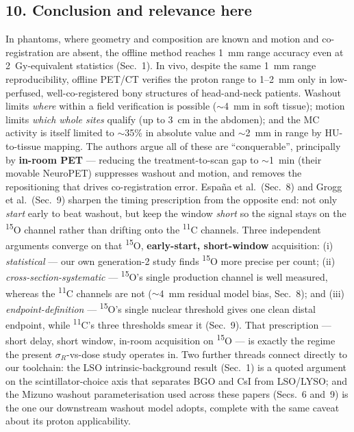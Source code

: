 \documentclass[11pt]{article}
\newcommand{\iso}[2]{\textsuperscript{#1}#2}
\begin{document}
\subsection*{10. Conclusion and relevance here}

In phantoms, where geometry and composition are known and motion and
co-registration are absent, the offline method reaches 1~mm range accuracy even
at 2~Gy-equivalent statistics (Sec.~1). In vivo, despite the same 1~mm range
reproducibility, offline PET/CT verifies the proton range to 1--2~mm only in
low-perfused, well-co-registered bony structures of head-and-neck patients.
Washout limits \emph{where} within a field verification is possible ($\sim$4~mm
in soft tissue); motion limits \emph{which whole sites} qualify (up to 3~cm in
the abdomen); and the MC activity is itself limited to $\sim$35\% in absolute
value and $\sim$2~mm in range by HU-to-tissue mapping. The authors argue all of
these are ``conquerable'', principally by \textbf{in-room PET} --- reducing the
treatment-to-scan gap to $\sim$1~min (their movable NeuroPET) suppresses washout
and motion, and removes the repositioning that drives co-registration error.
Espa\~na et al.\ (Sec.~8) and Grogg et al.\ (Sec.~9) sharpen the timing
prescription from the opposite end: not only \emph{start} early to beat washout,
but keep the window \emph{short} so the signal stays on the \iso{15}{O} channel
rather than drifting onto the \iso{11}{C} channels. Three independent arguments
converge on that \iso{15}{O}, \textbf{early-start, short-window} acquisition:
(i) \emph{statistical} --- our own generation-2 study finds \iso{15}{O} more
precise per count; (ii) \emph{cross-section-systematic} --- \iso{15}{O}'s single
production channel is well measured, whereas the \iso{11}{C} channels are not
($\sim$4~mm residual model bias, Sec.~8); and (iii) \emph{endpoint-definition}
--- \iso{15}{O}'s single nuclear threshold gives one clean distal endpoint, while
\iso{11}{C}'s three thresholds smear it (Sec.~9). That prescription --- short
delay, short window, in-room acquisition on \iso{15}{O} --- is exactly the regime
the present $\sigma_R$-vs-dose study operates in. Two further threads connect
directly to our toolchain: the LSO intrinsic-background result (Sec.~1) is a
quoted argument on the scintillator-choice axis that separates BGO and CsI from
LSO/LYSO; and the Mizuno washout parameterisation used across these papers
(Secs.~6 and~9) is the one our downstream washout model adopts, complete with the
same caveat about its proton applicability.
\end{document}
